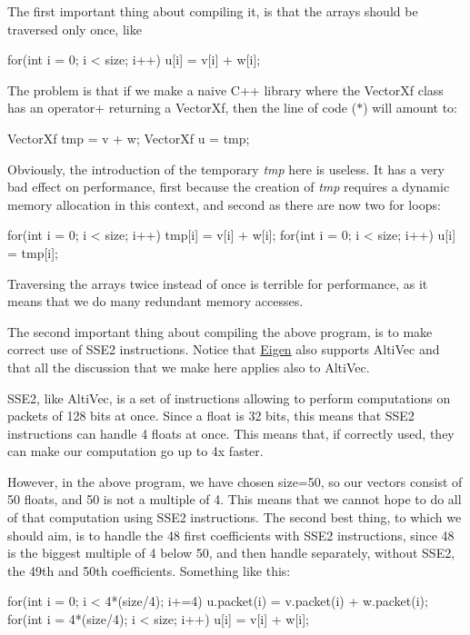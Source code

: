 The first important thing about compiling it, is that the arrays should be traversed only once, like 
\begin{DoxyCode}
\textcolor{keywordflow}{for}(\textcolor{keywordtype}{int} i = 0; i < size; i++) u[i] = v[i] + w[i];
\end{DoxyCode}
 The problem is that if we make a naive C++ library where the Vector\+Xf class has an operator+ returning a Vector\+Xf, then the line of code ($\ast$) will amount to\+: 
\begin{DoxyCode}
VectorXf tmp = v + w;
VectorXf u = tmp;
\end{DoxyCode}
 Obviously, the introduction of the temporary {\itshape tmp} here is useless. It has a very bad effect on performance, first because the creation of {\itshape tmp} requires a dynamic memory allocation in this context, and second as there are now two for loops\+: 
\begin{DoxyCode}
\textcolor{keywordflow}{for}(\textcolor{keywordtype}{int} i = 0; i < size; i++) tmp[i] = v[i] + w[i];
\textcolor{keywordflow}{for}(\textcolor{keywordtype}{int} i = 0; i < size; i++) u[i] = tmp[i];
\end{DoxyCode}
 Traversing the arrays twice instead of once is terrible for performance, as it means that we do many redundant memory accesses.

The second important thing about compiling the above program, is to make correct use of S\+S\+E2 instructions. Notice that \hyperlink{namespace_eigen}{Eigen} also supports Alti\+Vec and that all the discussion that we make here applies also to Alti\+Vec.

S\+S\+E2, like Alti\+Vec, is a set of instructions allowing to perform computations on packets of 128 bits at once. Since a float is 32 bits, this means that S\+S\+E2 instructions can handle 4 floats at once. This means that, if correctly used, they can make our computation go up to 4x faster.

However, in the above program, we have chosen size=50, so our vectors consist of 50 float\textquotesingle{}s, and 50 is not a multiple of 4. This means that we cannot hope to do all of that computation using S\+S\+E2 instructions. The second best thing, to which we should aim, is to handle the 48 first coefficients with S\+S\+E2 instructions, since 48 is the biggest multiple of 4 below 50, and then handle separately, without S\+S\+E2, the 49th and 50th coefficients. Something like this\+:


\begin{DoxyCode}
\textcolor{keywordflow}{for}(\textcolor{keywordtype}{int} i = 0; i < 4*(size/4); i+=4) u.packet(i)  = v.packet(i) + w.packet(i);
\textcolor{keywordflow}{for}(\textcolor{keywordtype}{int} i = 4*(size/4); i < size; i++) u[i] = v[i] + w[i];
\end{DoxyCode}


